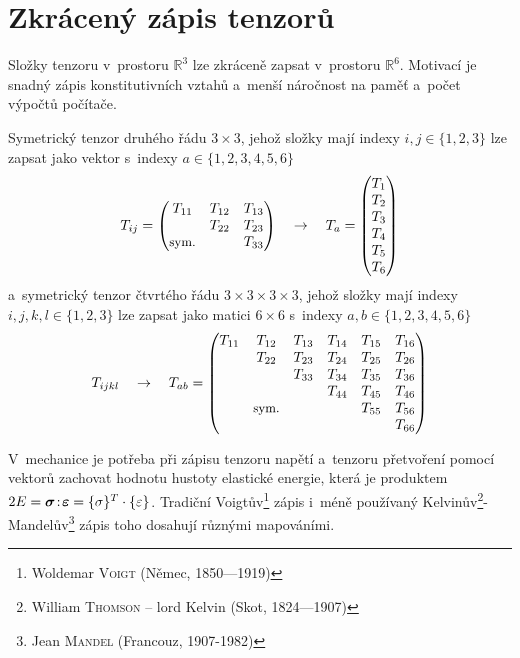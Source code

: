
\section{Zkrácený zápis tenzorů}
Složky tenzoru v~prostoru $\mathbb{R}^3$ lze zkráceně zapsat v~prostoru $\mathbb{R}^6$. Motivací je snadný zápis konstitutivních vztahů a~menší náročnost na paměť a~počet výpočtů počítače.

Symetrický tenzor druhého řádu $3 \times 3$, jehož složky mají indexy $i,j \in \{1,2,3\}$ lze zapsat jako vektor s~indexy $a \in \{1,2,3,4,5,6\}$
\begin{equation*}
	T_{ij} =
	\begin{pmatrix}
		T_{11} & T_{12} & T_{13} \\ & T_{22} & T_{23} \\ \text{\small sym.} & & T_{33} \\
	\end{pmatrix}
	\quad\rightarrow\quad
	T_a =
	\begin{pmatrix}
		T_1 \\ T_2 \\ T_3 \\ T_4 \\ T_5 \\ T_6 \\
	\end{pmatrix}
\end{equation*}
a~symetrický tenzor čtvrtého řádu $3 \times 3 \times 3 \times 3$, jehož složky mají indexy $i,j,k,l \in \{1,2,3\}$ lze zapsat jako matici $6 \times 6$ s~indexy $a,b \in \{1,2,3,4,5,6\}$
\begin{equation*}
	T_{ijkl}
	\quad\rightarrow\quad
	T_{ab} =
	\begin{pmatrix}
		T_{11} & T_{12} & T_{13} & T_{14} & T_{15} & T_{16} \\
		& T_{22} & T_{23} & T_{24} & T_{25} & T_{26} \\
		& & T_{33} & T_{34} & T_{35} & T_{36} \\
		& & & T_{44} & T_{45} & T_{46} \\
		& \text{\small sym.} & & & T_{55} & T_{56} \\
		& & & & & T_{66} \\
	\end{pmatrix}
\end{equation*}

V~mechanice je potřeba při zápisu tenzoru napětí a~tenzoru přetvoření pomocí vektorů zachovat hodnotu hustoty elastické energie, která je produktem $2E = \bm{\sigma}\!:\!\bm{\varepsilon} = \{\sigma\}^T\cdot\{\varepsilon\}$. Tradiční Voigtův\footnote{Woldemar \textsc{Voigt} (Němec, 1850---1919)} zápis i~méně používaný Kelvinův\footnote{William \textsc{Thomson} -- lord Kelvin (Skot, 1824---1907)}-Mandelův\footnote{Jean \textsc{Mandel} (Francouz, 1907-1982)} zápis toho dosahují různými mapováními.

